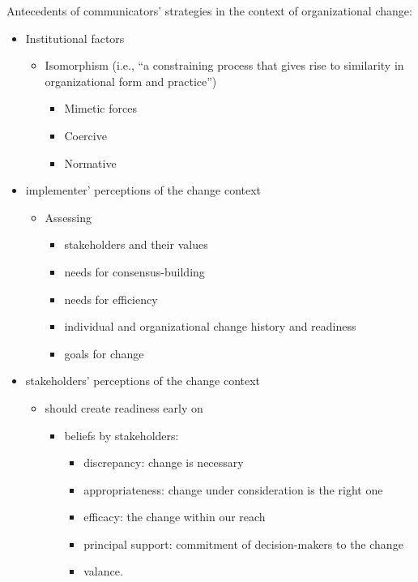 \documentclass[
]{book}
\begin{document}
Antecedents of communicators' strategies in the context of organizational change:

\begin{itemize}
\item
  Institutional factors

  \begin{itemize}
  \item
    Isomorphism (i.e., ``a constraining process that gives rise to similarity in organizational form and practice'')

    \begin{itemize}
    \item
      Mimetic forces
    \item
      Coercive
    \item
      Normative
    \end{itemize}
  \end{itemize}
\item
  implementer' perceptions of the change context

  \begin{itemize}
  \item
    Assessing

    \begin{itemize}
    \item
      stakeholders and their values
    \item
      needs for consensus-building
    \item
      needs for efficiency
    \item
      individual and organizational change history and readiness
    \item
      goals for change
    \end{itemize}
  \end{itemize}
\item
  stakeholders' perceptions of the change context

  \begin{itemize}
  \item
    should create readiness early on

    \begin{itemize}
    \item
      beliefs by stakeholders:

      \begin{itemize}
      \item
        discrepancy: change is necessary
      \item
        appropriateness: change under consideration is the right one
      \item
        efficacy: the change within our reach
      \item
        principal support: commitment of decision-makers to the change
      \item
        valance.
      \end{itemize}
    \end{itemize}
  \end{itemize}
\end{itemize}
\end{document}

